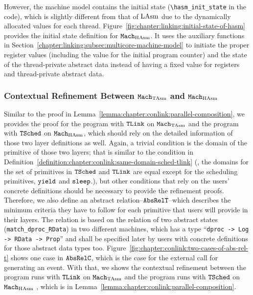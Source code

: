 However, the machine model contains the initial state (\lstinline$\hasm_init_state$ in the code),
which is slightly different from that of $\mathrm{LAsm}$ due to the dynamically allocated values for each thread.
Figure~\ref{fig:chapter:linking:initial-state-of-hasm} provides 
the initial state definition for ${\mathrm{\texttt{Mach}}}_{\mathrm{HAsm}}$.
It uses the auxiliary functions in Section~\ref{chapter:linking:subsec:multicore-machine-model} to
initiate the proper register values (including the value for the initial program counter) and the state of the thread-private abstract data instead of having a fixed value for registers and thread-private abstract data.
 
\subsubsection{Contextual Refinement Between ${\mathrm{\texttt{Mach}}}_{\mathrm{TAsm}}$ and ${\mathrm{\texttt{Mach}}}_{\mathrm{HAsm}}$}
 
 
Similar to the proof in Lemma~\ref{lemma:chapter:conlink:parallel-composition}, 
we provides the proof for the program with ${{\mathrm{\texttt{TLink}}}}$ on ${\mathrm{\texttt{Mach}}}_{\mathrm{TAsm}}$ and the program with ${{\mathrm{\texttt{TSched}}}}$ on ${\mathrm{\texttt{Mach}}}_{\mathrm{HAsm}}$,
which should rely on the detailed information of those two layer definitions as well. 
Again, a trivial condition is  the domain of the primitive of those two layers; that is similar to the condition in Definition~\ref{definition:chapter:conlink:same-domain-sched-tlink}
(\ie, the domains for the set of primitives in ${{\mathrm{\texttt{TSched}}}}$ and ${{\mathrm{\texttt{TLink}}}}$ are equal except for the scheduling primitives, ${\mathrm{\texttt{yield}}}$ and ${\mathrm{\texttt{sleep}}}$.),
but other conditions that rely on the users' concrete definitions
should be necessary to provide the refinement proofs.
Therefore, we also define an abstract relation--${{\mathrm{\texttt{AbsRelT}}}}$--which describes the minimum criteria they have to follow for each primitive that users will provide in their layers.
The relation is based on the relation of two abstract states (\lstinline$match_dproc_RData$) in two different machines, which has a
type ``\lstinline$dproc -> Log -> RData -> Prop$'' and shall be specified later by users with  concrete definitions for those abstract data types too. Figure~\ref{fig:chapter:conlink:two-cases-of-abs-rel-t} shows 
one case in  ${{\mathrm{\texttt{AbsRelC}}}}$, which is the case 
for the external call for generating an event. 
With that, we shows the contextual refinement between the program runs with ${{\mathrm{\texttt{TLink}}}}$ on ${\mathrm{\texttt{Mach}}}_{\mathrm{TAsm}}$ and the program runs with ${{\mathrm{\texttt{TSched}}}}$ on ${\mathrm{\texttt{Mach}}}_{\mathrm{HAsm}}$ , which is in Lemma~\ref{lemma:chapter:conlink:parallel-composition}. 

